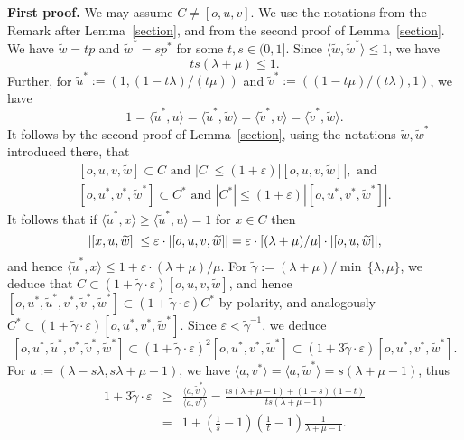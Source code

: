 \documentclass[12pt]{article}
\begin{document}

{\bf First proof.} 
We may assume $C \ne [o,u,v]$.
We use the notations from the Remark after Lemma~\ref{section}, and from
the second proof of Lemma~\ref{section}.
We have $\widetilde{w}=tp$ and $\widetilde{w}^*=sp^*$ for some $t,s\in(0,1]$.
Since $\langle \widetilde{w},\widetilde{w}^*\rangle\leq 1$, we have
\begin{equation}
\label{ts}
ts(\lambda+\mu)\leq 1.
\end{equation}
Further, for $\tilde{u}^*:=\left(1,(1-t\lambda )/(t\mu )\right)$ and 
$\tilde{v}^*:=\left( (1-t\mu)/(t\lambda ),1\right)$, we have
$$
1=\langle \tilde{u}^*,u\rangle=\langle \tilde{u}^*,\widetilde{w}\rangle
=\langle \tilde{v}^*,v\rangle=\langle \tilde{v}^*,\widetilde{w}\rangle.
$$
It follows by the second proof of Lemma~\ref{section}, using the notations
$\widetilde{w},{\widetilde{w}}^*$ introduced there, that
\begin{eqnarray}
\label{uvinC}
[o,u,v,\widetilde{w}]\subset C 
\mbox{ \ and \ }
|C|\leq(1+\varepsilon)|[o,u,v,\widetilde{w}]|, \mbox{ \ and} \\
\label{u*v*inC*}
[o,u^*,v^*,\widetilde{w}^*]\subset C^* 
\mbox{ \ and \ }
|C^*|\leq(1+\varepsilon)|[o,u^*,v^*,\widetilde{w}^*]|.
\end{eqnarray}
It follows that if 
$\langle\tilde{u}^*,x\rangle\geq\langle\tilde{u}^*,u\rangle=1$
for $x\in C$ then
$$
|[x,u,\widetilde{w}]|\leq \varepsilon\cdot|[o,u,v,\widetilde{w}]|
=\varepsilon\cdot
\mbox{$ [ (\lambda+\mu )/\mu ] $}\cdot|[o,u,\widetilde{w}]|,
$$
and hence $\langle\tilde{u}^*,x\rangle\leq 
1+\varepsilon\cdot (\lambda+\mu)/\mu $.
For $\widetilde{\gamma}:=(\lambda+\mu)/\min \, \{\lambda,\mu\} $,
we deduce that 
$C\subset(1+\widetilde{\gamma}\cdot\varepsilon)[o,u,v,\widetilde{w}]$,
and hence $[o,u^*,\tilde{u}^*,v^*,\tilde{v}^*,\widetilde{w}^*]
\subset(1+\widetilde{\gamma}\cdot\varepsilon)C^*$ by polarity,
and analogously 
$C^*\subset(1+\widetilde{\gamma}\cdot\varepsilon)[o,u^*,v^*,\widetilde{w}^*]$.
Since $\varepsilon<\widetilde{\gamma}^{-1}$, we deduce
$$
[o,u^*,\tilde{u}^*,v^*,\tilde{v}^*,\widetilde{w}^*]
\subset(1+\widetilde{\gamma}\cdot\varepsilon)^2[o,u^*,v^*,\widetilde{w}^*]
\subset(1+3\widetilde{\gamma}\cdot\varepsilon)[o,u^*,v^*,\widetilde{w}^*].
$$
For $a:=(\lambda-s\lambda,s\lambda+\mu-1)$, we have 
$\langle a,v^*\rangle=\langle a,\widetilde{w}^*\rangle=s(\lambda+\mu-1)$, thus
\begin{eqnarray*}
1+3\widetilde{\gamma}\cdot\varepsilon&\geq&
\frac{\langle a,\tilde{v}^*\rangle}{\langle a,v^*\rangle}=
\frac{ts(\lambda+\mu-1)+(1-s)(1-t)}{ts(\lambda+\mu-1)}\\
&=&
1+\left(\frac1s-1\right)\left(\frac1t-1\right)\frac1{\lambda+\mu-1}.
\end{eqnarray*}
\end{document}
